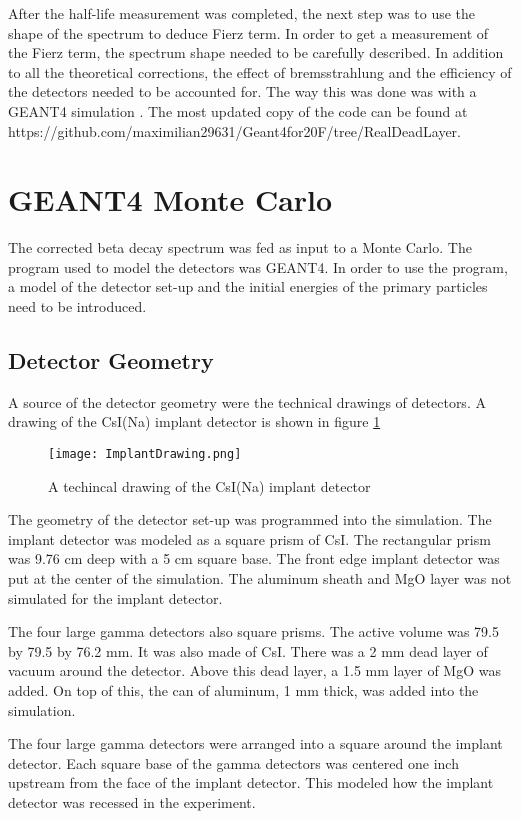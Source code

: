 \documentclass[main.tex]{subfiles}
\begin{document}
After the half-life measurement was completed, the next step was to use the shape of the spectrum to deduce Fierz term. 
In order to get a measurement of the Fierz term, the spectrum shape needed to be carefully described.
In addition to all the theoretical corrections, the effect of bremsstrahlung and the efficiency of the detectors needed to be accounted for.
The way this was done was with a GEANT4 simulation \cite{Ago03}.
The most updated copy of the code can be found at https://github.com/maximilian29631/Geant4for20F/tree/RealDeadLayer. 


\section{GEANT4 Monte Carlo}
The corrected beta decay spectrum was fed as input to a Monte Carlo.
The program used to model the detectors was GEANT4.
In order to use the program, a model of the detector set-up and the initial energies of the primary particles need to be introduced.  

\subsection{Detector Geometry}
A source of the detector geometry were the technical drawings of detectors. 
A drawing of the CsI(Na) implant detector is shown in figure \ref{fig:ImplantTech}

\begin{figure}[!htb]
	\centerline{\texttt{[image: ImplantDrawing.png]}}
	\caption{A techincal drawing of the CsI(Na) implant detector}
	\label{fig:ImplantTech}
\end{figure}


The geometry of the detector set-up was programmed into the simulation.
The implant detector was modeled as a square prism of CsI.
The rectangular prism was 9.76 cm deep with a 5 cm square base.
The front edge implant detector was put at the center of the simulation.
The aluminum sheath and MgO layer was not simulated for the implant detector.

The four large gamma detectors also square prisms.
The active volume was 79.5 by 79.5 by 76.2 mm.
It was also made of CsI.
There was a 2 mm dead layer of vacuum around the detector.
Above this dead layer, a 1.5 mm layer of MgO was added.
On top of this, the can of aluminum, 1 mm thick, was added into the simulation.

The four large gamma detectors were arranged into a square around the implant detector.
Each square base of the gamma detectors was centered one inch upstream from the face of the implant detector.
This modeled how the implant detector was recessed in the experiment.
\end{document}
